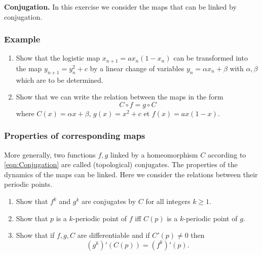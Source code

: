 \documentclass{article}
\begin{document}
\begin{question}
  \textbf{Conjugation.} In this exercise we consider the maps that can be linked by conjugation.
  
  \subsubsection*{Example}
  \begin{enumerate}[label=(\alph*)]
    \item Show that the logistic map $x_{n+1}=ax_n(1-x_n)$ can be transformed into the map $y_{n+1} = y_n^2 + c$ by a linear change of variables $y_n = \alpha x_n+\beta$ with $\alpha,\beta$ which are to be determined.
 
    \item Show that we can write the relation between the maps in the form
    \begin{equation}
      C\circ f = g \circ C
      \label{eqn:Conjugation}
    \end{equation}
    where $C(x) = \alpha x + \beta$, $g(x) = x^2+c$ et $f(x) = a x (1-x)$.
    \end{enumerate}
    
    \subsubsection*{Properties of corresponding maps}
  \noindent More generally, two functions $f,g$ linked by a homeomorphism $C$ according to \eqref{eqn:Conjugation} are called (topological) conjugates. The properties of the dynamics of the maps can be linked. Here we consider the relations between their periodic points.
  
  \begin{enumerate}[label=(\alph*),resume]
    \item Show that $f^k$ and $g^k$ are conjugates by $C$ for all integers $k\geqslant 1$. 
    \item Show that $p$ is a $k$-periodic point of $f$ iff $C(p)$ is a $k$-periodic point of $g$.
    \item Show that if $f,g,C$ are differentiable and if $C'(p)\neq 0$ then 
    \begin{equation}
      (g^k)'(C(p)) = (f^k)'(p).
    \end{equation}
  
  \end{enumerate}

\end{question}
\end{document}
